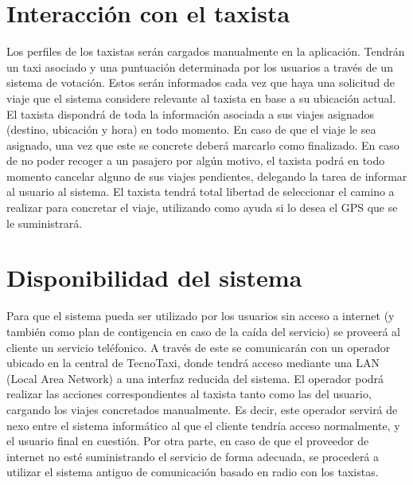 \section{Interacción con el taxista}
Los perfiles de los taxistas serán cargados manualmente en la aplicación. Tendrán un taxi asociado y una puntuación determinada por los usuarios a través de un sistema de votación. Estos serán informados cada vez que haya una solicitud de viaje que el sistema considere relevante al taxista en base a su ubicación actual. El taxista dispondrá de toda la información asociada a sus viajes asignados (destino, ubicación y hora) en todo momento. En caso de que el viaje le sea asignado, una vez que este se concrete deberá marcarlo como finalizado. En caso de no poder recoger a un pasajero por algún motivo, el taxista podrá en todo momento cancelar alguno de sus viajes pendientes, delegando la tarea de informar al usuario al sistema. El taxista tendrá total libertad de seleccionar el camino a realizar para concretar el viaje, utilizando como ayuda si lo desea el GPS que se le suministrará.

\section{Disponibilidad del sistema}
Para que el sistema pueda ser utilizado por los usuarios sin acceso a internet (y también como plan de contigencia en caso de la caída del servicio) se proveerá al cliente un servicio teléfonico. A través de este se comunicarán con un operador ubicado en la central de TecnoTaxi, donde tendrá acceso mediante una LAN (Local Area Network) a una interfaz reducida del sistema. El operador podrá realizar las acciones correspondientes al taxista tanto como las del usuario, cargando los viajes concretados manualmente. Es decir, este operador servirá de nexo entre el sistema informático al que el cliente tendría acceso normalmente, y el usuario final en cuestión. Por otra parte, en caso de que el proveedor de internet no esté suministrando el servicio de forma adecuada, se procederá a utilizar el sistema antiguo de comunicación basado en radio con los taxistas.


